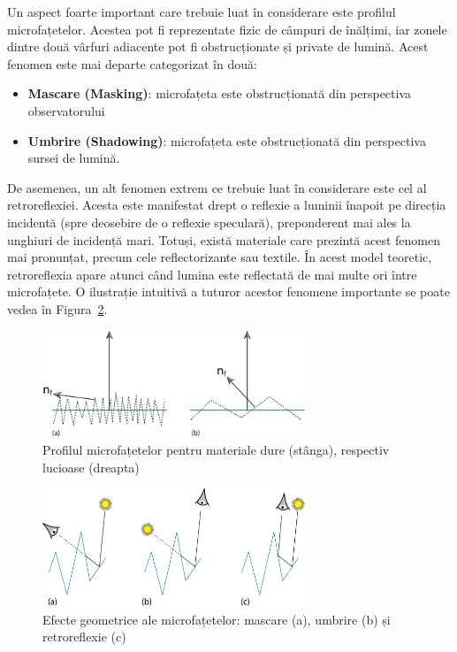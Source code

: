 \documentclass[12pt,a4paper]{report}
\numberwithin{equation}{section} %
\begin{document}
Un aspect foarte important care trebuie luat în considerare este profilul microfațetelor.
Acestea pot fi reprezentate fizic de câmpuri de înălțimi, iar zonele dintre două
vârfuri adiacente pot fi obstrucționate și private de lumină. Acest fenomen este
mai departe categorizat în două:

\begin{itemize}
	\item \textbf{Mascare (Masking)}: microfațeta este obstrucționată din perspectiva observatorului
	\item \textbf{Umbrire (Shadowing)}: microfațeta este obstrucționată din perspectiva sursei de lumină.
\end{itemize}

De asemenea, un alt fenomen extrem ce trebuie luat în considerare este cel al
retroreflexiei. Acesta este manifestat drept o reflexie a luminii înapoit pe direcția
incidentă (spre deosebire de o reflexie speculară), preponderent mai ales la unghiuri
de incidență mari. Totuși, există materiale care prezintă acest fenomen mai pronunțat,
precum cele reflectorizante sau textile.
În acest model teoretic, retroreflexia apare
atunci când lumina este reflectată de mai multe ori între microfațete. O ilustrație
intuitivă a tuturor acestor fenomene importante se poate vedea în Figura~\ref{fig:microfacet_effects}.

\begin{figure}[ht]
	\centering
	\includegraphics[width=0.7\textwidth]{pics/microfacet.png}
	\caption{Profilul microfațetelor pentru materiale dure (stânga), respectiv lucioase (dreapta)\protect{}}
	\label{fig:microfacet}
\end{figure}

\begin{figure}[ht]
	\centering
	\includegraphics[width=0.7\textwidth]{pics/microfacet_effects.png}
	\caption{Efecte geometrice ale microfațetelor: mascare (a), umbrire (b) și retroreflexie (c)\protect{}}
	\label{fig:microfacet_effects}
\end{figure}
\end{document}
